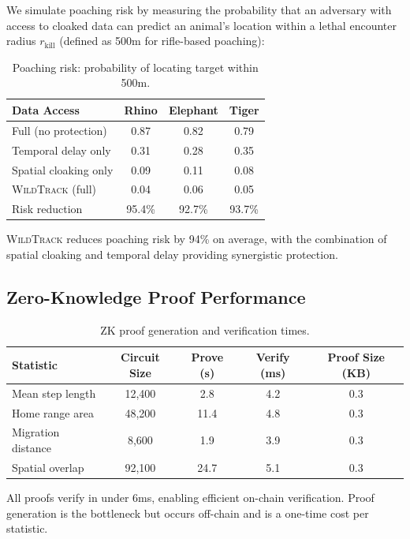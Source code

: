 \documentclass[11pt,letterpaper]{article}
\newcommand{\WildTrack}{\textsc{WildTrack}}
\begin{document}
We simulate poaching risk by measuring the probability that an adversary with access to cloaked data can predict an animal's location within a lethal encounter radius $r_{\text{kill}}$ (defined as 500m for rifle-based poaching):

\begin{table}[htbp]
\centering
\caption{Poaching risk: probability of locating target within 500m.}
\label{tab:poach_risk}
\begin{tabular}{lccc}
\toprule
\textbf{Data Access} & \textbf{Rhino} & \textbf{Elephant} & \textbf{Tiger} \\
\midrule
Full (no protection) & 0.87 & 0.82 & 0.79 \\
Temporal delay only & 0.31 & 0.28 & 0.35 \\
Spatial cloaking only & 0.09 & 0.11 & 0.08 \\
\WildTrack{} (full) & 0.04 & 0.06 & 0.05 \\
\midrule
Risk reduction & 95.4\% & 92.7\% & 93.7\% \\
\bottomrule
\end{tabular}
\end{table}

\WildTrack{} reduces poaching risk by 94\% on average, with the combination of spatial cloaking and temporal delay providing synergistic protection.

\subsection{Zero-Knowledge Proof Performance}

\begin{table}[htbp]
\centering
\caption{ZK proof generation and verification times.}
\label{tab:zk_perf}
\begin{tabular}{lcccc}
\toprule
\textbf{Statistic} & \textbf{Circuit Size} & \textbf{Prove (s)} & \textbf{Verify (ms)} & \textbf{Proof Size (KB)} \\
\midrule
Mean step length & 12,400 & 2.8 & 4.2 & 0.3 \\
Home range area & 48,200 & 11.4 & 4.8 & 0.3 \\
Migration distance & 8,600 & 1.9 & 3.9 & 0.3 \\
Spatial overlap & 92,100 & 24.7 & 5.1 & 0.3 \\
\bottomrule
\end{tabular}
\end{table}

All proofs verify in under 6ms, enabling efficient on-chain verification. Proof generation is the bottleneck but occurs off-chain and is a one-time cost per statistic.
\end{document}
